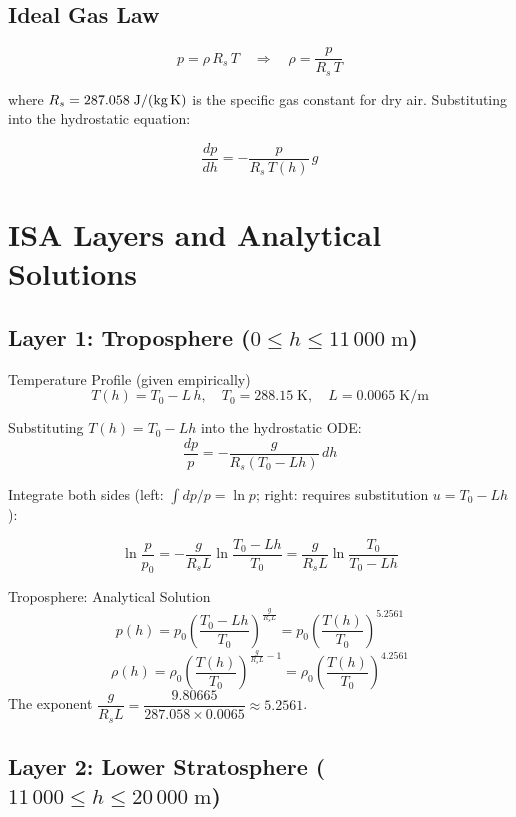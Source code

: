 \documentclass[12pt, a4paper]{article}
\begin{document}
\subsection*{Ideal Gas Law}

\[
  p = \rho\,R_s\,T \quad \Rightarrow \quad \rho = \frac{p}{R_s\,T}
\]

where $R_s = 287.058\;\text{J/(kg\,K)}$ is the specific gas constant for dry air.
Substituting into the hydrostatic equation:

\[
  \frac{dp}{dh} = -\frac{p}{R_s\,T(h)}\,g
\]

\section{ISA Layers and Analytical Solutions}

\subsection*{Layer 1: Troposphere ($0 \leq h \leq 11\,000\;\text{m}$)}

\begin{theorybox}{Temperature Profile (given empirically)}
\[
  T(h) = T_0 - L\,h, \quad T_0 = 288.15\;\text{K},\quad L = 0.0065\;\text{K/m}
\]
\end{theorybox}

Substituting $T(h) = T_0 - Lh$ into the hydrostatic ODE:
\[
  \frac{dp}{p} = -\frac{g}{R_s(T_0 - Lh)}\,dh
\]

Integrate both sides (left: $\int dp/p = \ln p$; right: requires substitution $u = T_0 - Lh$):

\[
  \ln\frac{p}{p_0} = -\frac{g}{R_s L}\ln\frac{T_0-Lh}{T_0} = \frac{g}{R_s L}\ln\frac{T_0}{T_0-Lh}
\]

\begin{theorybox}{Troposphere: Analytical Solution}
\[
  p(h) = p_0 \left(\frac{T_0 - Lh}{T_0}\right)^{\!\frac{g}{R_s L}}
         = p_0 \left(\frac{T(h)}{T_0}\right)^{5.2561}
\]
\[
  \rho(h) = \rho_0 \left(\frac{T(h)}{T_0}\right)^{\!\frac{g}{R_s L}-1}
           = \rho_0 \left(\frac{T(h)}{T_0}\right)^{4.2561}
\]
The exponent $\dfrac{g}{R_s L} = \dfrac{9.80665}{287.058 \times 0.0065} \approx 5.2561$.
\end{theorybox}

\subsection*{Layer 2: Lower Stratosphere ($11\,000 \leq h \leq 20\,000\;\text{m}$)}
\end{document}
